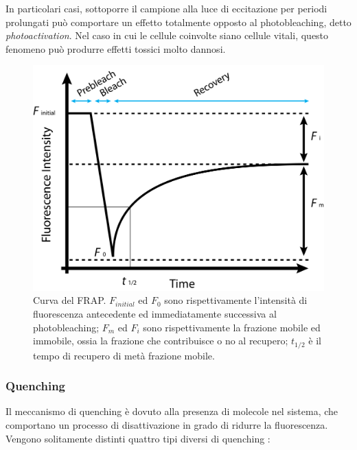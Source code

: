 In particolari casi, sottoporre il campione alla luce di eccitazione per periodi prolungati può comportare un effetto totalmente opposto al photobleaching, detto \textit{photoactivation}. 
Nel caso in cui le cellule coinvolte siano cellule vitali, questo fenomeno può produrre effetti tossici molto dannosi.

\begin{figure}
 \centering
 \includegraphics[scale=.80]{img/CAP1FRAP.png}
 \caption{\small{Curva del FRAP. $F_{initial}$ ed $F_0$ sono rispettivamente l'intensità di fluorescenza antecedente ed immediatamente successiva al photobleaching; $F_m$ ed $F_i$ sono rispettivamente la frazione mobile ed immobile, ossia la frazione che contribuisce o no al recupero; $t_{1/2}$ è il tempo di recupero di metà frazione mobile.}}
 \label{fig:FRAP}
\end{figure}

\subsubsection{Quenching}
Il meccanismo di quenching è dovuto alla presenza di molecole nel sistema, che comportano un processo di disattivazione in grado di ridurre la fluorescenza. Vengono solitamente distinti quattro tipi diversi di quenching \cite{quenching}:

